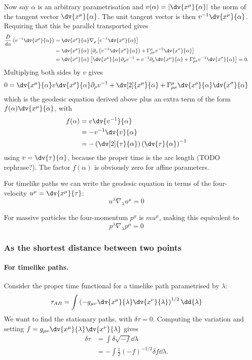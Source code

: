 Now say $\alpha$ is an arbitrary parametrisation and $v(\alpha) = \left|\dv{x^\mu}{\alpha}\right|$ the norm of the tangent vector $\dv{x^\mu}{\alpha}$. The unit tangent vector is then $v^{-1}\dv{x^\mu}{\alpha}$. Requiring that this be parallel transported gives
\begin{align*}
\frac{D}{d\alpha}\left(v^{-1}\dv{x^\mu}{\alpha}\right) &= \dv{x^\rho}{\alpha}\nabla_\rho\left[v^{-1}\dv{x^\mu}{\alpha}\right] \\
&= \dv{x^\rho}{\alpha} \left[\partial_\rho \left(v^{-1}\dv{x^\mu}{\alpha}\right) + \Gamma^\mu_{\rho\sigma}v^{-1}\dv{x^\sigma}{\alpha}\right] \\
&= \dv{x^\rho}{\alpha} \left[\dv{x^\mu}{\alpha}\partial_\rho v^{-1} + v^{-1}\partial_\rho \dv{x^\mu}{\alpha} + \Gamma^\mu_{\rho\sigma}v^{-1}\dv{x^\sigma}{\alpha}\right] = 0.
\end{align*}
Multiplying both sides by $v$ gives
\[ 0 = \dv{x^\mu}{\alpha}v\dv{x^\rho}{\alpha}\partial_\rho v^{-1} + \dv[2]{x^\mu}{\alpha} + \Gamma^\mu_{\rho\sigma}\dv{x^\rho}{\alpha}\dv{x^\sigma}{\alpha} \]
which is the geodesic equation derived above plus an extra term of the form $f(\alpha)\dv{x^\mu}{\alpha}$, with
\begin{align*}
f(\alpha) &= v \dv{v^{-1}}{\alpha} \\
&= -v^{-1}\dv{v}{\alpha} \\
&= - \left(\dv[2]{\tau}{\alpha}\right)\left(\dv{\tau}{\alpha}\right)^{-1}
\end{align*}
using $v = \dv{\tau}{\alpha}$, because the proper time is the arc length (TODO rephrase?). The factor $f(\alpha)$ is obviously zero for affine parameters.

For timelike paths we can write the geodesic equation in terms of the four-velocity $u^\mu = \dv{x^\mu}{\tau}$:
\[ u^\lambda\nabla_\lambda u^\mu = 0 \]

For massive particles the four-momentum $p^\mu$ is $mu^\mu$, making this equivalent to
\[ p^\lambda\nabla_\lambda p^\mu = 0 \]

\subsubsection{As the shortest distance between two points}
\paragraph{For timelike paths.} Consider the proper time functional for a timelike path parametrised by $\lambda$:
\[ \tau_{AB} = \int \left(-g_{\mu\nu} \dv{x^\mu}{\lambda}\dv{x^\nu}{\lambda}\right)^{1/2} \dd{\lambda} \]
We want to find the stationary paths, with $\delta \tau = 0$. Computing the variation and setting $f = g_{\mu\nu} \dv{x^\mu}{\lambda}\dv{x^\nu}{\lambda}$ gives
\begin{align*}
\delta \tau &= \int \delta\sqrt{-f}\dd{\lambda} \\
&= -\int \frac{1}{2}(-f)^{-1/2}\delta f \dd{\lambda}.
\end{align*}

